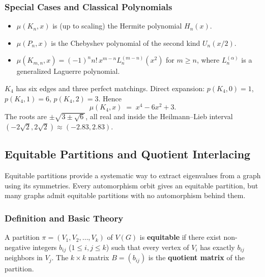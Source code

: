 \subsubsection{Special Cases and Classical Polynomials}

\begin{theorem}
\mbox{}
\begin{itemize}
  \item $\mu(K_n, x)$ is (up to scaling) the Hermite polynomial $H_n(x)$.
  \item $\mu(P_n, x)$ is the Chebyshev polynomial of the second kind
        $U_n(x/2)$.
  \item $\mu(K_{m, n}, x) = (-1)^n n!\, x^{m - n} L_n^{(m - n)}(x^2)$ for
        $m \ge n$, where $L_n^{(\alpha)}$ is a generalized Laguerre
        polynomial.
\end{itemize}
\end{theorem}

\begin{example}
$K_4$ has six edges and three perfect matchings. Direct expansion:
$p(K_4, 0) = 1$, $p(K_4, 1) = 6$, $p(K_4, 2) = 3$. Hence
\[
  \mu(K_4, x) \;=\; x^4 - 6 x^2 + 3.
\]
The roots are $\pm \sqrt{3 \pm \sqrt{6}}$, all real and inside the
Heilmann--Lieb interval $(-2\sqrt{2}, 2\sqrt{2}) \approx (-2.83, 2.83)$.
\end{example}

\subsection{Equitable Partitions and Quotient Interlacing}\label{subsec:equitable-partitions}

Equitable partitions provide a systematic way to extract eigenvalues
from a graph using its symmetries. Every automorphism orbit gives an
equitable partition, but many graphs admit equitable partitions with
no automorphism behind them.

\subsubsection{Definition and Basic Theory}

\begin{definition}\label{def:equitable}
A partition $\pi = (V_1, V_2, \ldots, V_k)$ of $V(G)$ is
\textbf{equitable} if there exist non-negative integers
$b_{ij}$ ($1 \le i, j \le k$) such that every vertex of $V_i$ has
exactly $b_{ij}$ neighbors in $V_j$. The $k \times k$ matrix
$B = (b_{ij})$ is the \textbf{quotient matrix} of the partition.
\end{definition}

